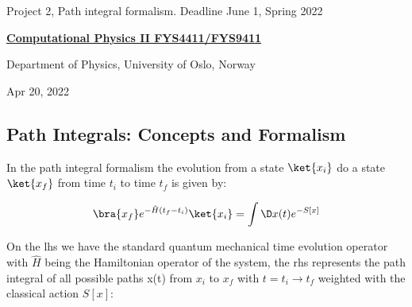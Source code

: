\documentclass[%
oneside,                 %
final,                   %
10pt]{article}
\begin{document}

\newcommand{\exercisesection}[1]{\subsection*{#1}}






\thispagestyle{empty}

\begin{center}
{\LARGE\bf
\begin{spacing}{1.25}
Project 2, Path integral formalism. Deadline June 1, Spring 2022
\end{spacing}
}
\end{center}


\begin{center}
{\bf \href{{http://www.uio.no/studier/emner/matnat/fys/FYS4411/index-eng.html}}{Computational Physics II FYS4411/FYS9411}}
\end{center}

    \begin{center}
\centerline{{\small Department of Physics, University of Oslo, Norway}}
\end{center}
    

\begin{center}
Apr 20, 2022
\end{center}

\vspace{1cm}


\subsection*{Path Integrals: Concepts and Formalism}

In the path integral formalism the evolution from a state $\ket{x_i}$ do a state $\ket{x_f}$ from time $t_i$ to time $t_f$ is given by:

\[
	\bra{x_f}e^{-\hat{H}(t_f-t_i)}\ket{x_i} = \int \D x(t) e^{-S[x]}
\]

On the lhs we have the standard quantum mechanical time evolution operator with $\hat{H}$ being the Hamiltonian operator of the system, the rhs represents the path integral of all possible paths x(t) from $x_i$ to $x_f$ with $t = t_i \rightarrow t_f$ weighted with the classical action $S[x]$:
\end{document}
